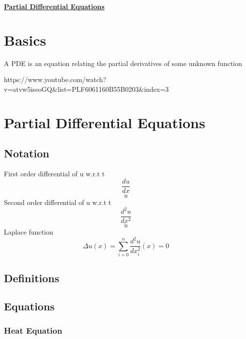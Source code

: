 \documentclass[10pt,a4paper]{report}
\begin{document}
	\begin{center}
		\underline{\textbf{Partial Differential Equations}}
	\end{center}
	
	\tableofcontents

\chapter{Basics}

A PDE is an equation relating the partial derivatives of some unknown function

https://www.youtube.com/watch?v=atvw5iseoGQ\&list=PLF6061160B55B0203\&index=3

\chapter{Partial Differential Equations}

\section{Notation}
First order differential of u w.r.t t
\begin{equation}
	\frac{du}{dx}
\end{equation}
\begin{equation}
	\dot u
\end{equation}
Second order differential of u w.r.t t
\begin{equation}
	\frac{d^2u}{dx^2}
\end{equation}
\begin{equation}
	\ddot u
\end{equation}
Laplace function
\begin{equation}
	\Delta u (x) = \sum_{i=0}^{n} \frac{d^2u}{dx_i^2} (x) = 0
\end{equation}

\section{Definitions}

\section{Equations}

\subsection{Heat Equation}
\end{document}
